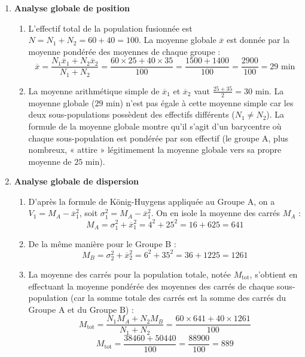 \documentclass[11pt,a4paper]{article}
\begin{document}
\begin{enumerate}
    \item \textbf{Analyse globale de position}
    \begin{enumerate}
        \item L'effectif total de la population fusionnée est $N = N_1 + N_2 = 60 + 40 = 100$. La moyenne globale $\overline{x}$ est donnée par la moyenne pondérée des moyennes de chaque groupe :
        \[ \overline{x} = \frac{N_1\overline{x}_1 + N_2\overline{x}_2}{N_1 + N_2} = \frac{60 \times 25 + 40 \times 35}{100} = \frac{1500 + 1400}{100} = \frac{2900}{100} = 29 \text{ min} \]
        
        \item La moyenne arithmétique simple de $\overline{x}_1$ et $\overline{x}_2$ vaut $\frac{25+35}{2} = 30$ min. La moyenne globale ($29$ min) n'est pas égale à cette moyenne simple car les deux sous-populations possèdent des effectifs différents ($N_1 \neq N_2$). La formule de la moyenne globale montre qu'il s'agit d'un barycentre où chaque sous-population est pondérée par son effectif (le groupe A, plus nombreux, « attire » légitimement la moyenne globale vers sa propre moyenne de $25$ min).
    \end{enumerate}

    \item \textbf{Analyse globale de dispersion}
    \begin{enumerate}
        \item D'après la formule de König-Huygens appliquée au Groupe A, on a $V_1 = M_A - \overline{x}_1^2$, soit $\sigma_1^2 = M_A - \overline{x}_1^2$. On en isole la moyenne des carrés $M_A$ :
        \[ M_A = \sigma_1^2 + \overline{x}_1^2 = 4^2 + 25^2 = 16 + 625 = 641 \]
        
        \item De la même manière pour le Groupe B :
        \[ M_B = \sigma_2^2 + \overline{x}_2^2 = 6^2 + 35^2 = 36 + 1225 = 1261 \]
        
        \item La moyenne des carrés pour la population totale, notée $M_{\text{tot}}$, s'obtient en effectuant la moyenne pondérée des moyennes des carrés de chaque sous-population (car la somme totale des carrés est la somme des carrés du Groupe A et du Groupe B) :
        \[ M_{\text{tot}} = \frac{N_1 M_A + N_2 M_B}{N_1 + N_2} = \frac{60 \times 641 + 40 \times 1261}{100} \]
        \[ M_{\text{tot}} = \frac{38460 + 50440}{100} = \frac{88900}{100} = 889 \]
        

\end{enumerate}
\end{enumerate}
\end{document}

